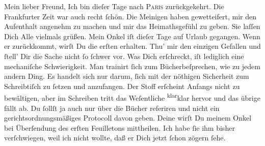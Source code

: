 \pstart\center{}Mein lieber Freund,\pend\vspace{0.5em}
\pstart
           Ich bin dieſer Tage nach \textsc{Paris} zurückgekehrt. Die Frankfurter Zeit war
               auch recht{ }ſchön. Die Meinigen haben gewetteifert, mir den Aufenthalt angenehm zu
                  machen\strikeout{,} und 
               mir das Heimathsgefühl zu geben. Sie laſſen Dich Alle vielmals grüßen. Mein Onkel iſt dieſer Tage auf
               Urlaub gegangen. Wenn er zurückkommt, wirſt Du die erſten \label{K_L02614-1v}\label{K_L02614-1} erhalten. Thu’ mir den einzigen Gefallen und{ }ſtell’ Dir die Sache nicht {\pb}ſo{ }ſchwer vor. Was Dich erſchreckt, iſt lediglich
               eine mechaniſche Schwierigkeit. Man trainirt{ }ſich zum Bücherbeſprechen, wie zu jedem
               andern Ding. Es handelt sich nur darum,{ }ſich mit der nöthigen Sicherheit zum
               Schreibtiſch zu{ }ſetzen und anzufangen. Der Stoff erſcheint Anfangs nicht zu
               bewältigen, aber im Schreiben tritt das Weſentliche \substVorne{}\textsuperscript{klar}\substDazwischen{}klar\substHinten{} hervor und das übrige fällt ab. Du{ }ſollſt ja auch nur  über die Bücher referiren und nicht ein
               gerichtsordnungsmäßiges Protocoll {\pb}davon geben.
               Deine \label{K_L02614-2v}\label{K_L02614-2} wirſt Du meinem Onkel bei Überſendung des erſten Feuilletons mittheilen.
               Ich habe{ }ſie ihm bisher \strikeout{\textcolor{gray}{m}} verſchwiegen, weil ich nicht wollte, daß er Dich jetzt{ }ſchon zögern{ }ſehe.\pend
           

